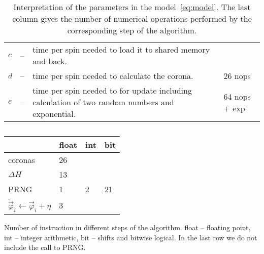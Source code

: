 \documentclass[a4paper]{llncs}
\newcommand{\vphi}{\vec{\varphi}}
\begin{document}
\begin{table}
\begin{center} \begin{tabular}{lcp{8cm}p{2cm}}
$c$ &--& time per spin needed to load it to shared memory and back.&\\
$d$ &--& time per spin needed to calculate the corona.& 26 nops\\
$e$ &--& time per spin needed to for update including calculation of two
random numbers and exponential. & 64 nops + exp
\end{tabular}
\end{center}
\caption{\label{tab:pars-int}Interpretation of the parameters in the
model~\ref{eq:model}. The last column gives the number of numerical operations
performed by the corresponding step of the algorithm.}
\end{table}

\begin{table}
\begin{center} 
\begin{tabular}{|p{4cm}|l|l|l|}\hline\hline
 & float & int  & bit \\\hline
coronas & 26 & & \\\hline
$\Delta H  $ & 13  & & \\\hline
PRNG & 1 & 2  & 21  \\\hline
$\widetilde{\vphi}_i \gets \vphi_i+\eta$& 3 & &\\\hline\hline
\end{tabular}
\end{center}
\caption{\label{tab:instr-count}}Number of instruction in different steps of the
algorithm. float -- floating point, int -- integer arithmetic, bit -- shifts and
bitwise logical. In the last row we do not include the call to PRNG. 
\end{table}
\end{document}
